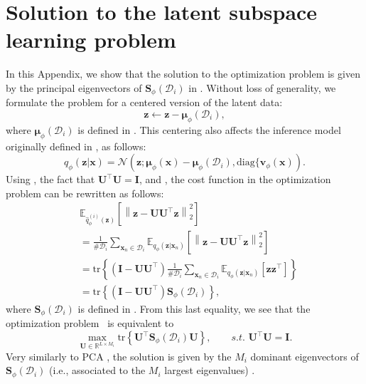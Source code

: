 \documentclass[review]{elsarticle}
\newcommand{\diag}{\text{diag}}
\newcommand{\tr}{\text{tr}}
\begin{document}
\appendix
\section{Solution to the latent subspace learning problem}
\label{app:PCA}

In this Appendix, we show that the solution to the optimization problem  is given by the principal eigenvectors of $\mathbf{S}_\phi(\mathcal{D}_i)$ in . Without loss of generality, we formulate the problem for a centered version of the latent data:
\begin{equation}
    \mathbf{z} \leftarrow \mathbf{z} - \boldsymbol{\mu}_\phi(\mathcal{D}_i),
\end{equation}
where $\boldsymbol{\mu}_\phi(\mathcal{D}_i)$ is defined in . This centering also affects the inference model originally defined in , as follows:
\begin{equation}
    q_\phi(\mathbf{z} | \mathbf{x}) = \mathcal{N}\left(\mathbf{z}; \boldsymbol{\mu}_{\phi}(\mathbf{x}) - \boldsymbol{\mu}_\phi(\mathcal{D}_i), \diag\{\mathbf{v}_{\phi}(\mathbf{x}) \right).
    \label{inf_model_center}
\end{equation}
Using , the fact that $\mathbf{U}^\top \mathbf{U} = \mathbf{I}$, and , the cost function in the optimization problem  can be rewritten as follows:
\begin{align}
    & \mathbb{E}_{\hat{q}_\phi^{(i)}(\mathbf{z})} \left[ \left\lVert \mathbf{z} - \mathbf{U} \mathbf{U}^\top \mathbf{z} \right\rVert_2^2 \right] \nonumber \\
    & = \frac{1}{\# \mathcal{D}_i} \sum_{\mathbf{x}_n \in \mathcal{D}_i} \mathbb{E}_{q_\phi(\mathbf{z} | \mathbf{x}_n)}\left[ \left\lVert \mathbf{z} - \mathbf{U} \mathbf{U}^\top \mathbf{z} \right\rVert_2^2 \right] \nonumber \\
    & = \tr\left\{ (\mathbf{I} - \mathbf{U} \mathbf{U}^\top) \frac{1}{\# \mathcal{D}_i} \sum_{\mathbf{x}_n \in \mathcal{D}_i} \mathbb{E}_{q_\phi(\mathbf{z} | \mathbf{x}_n)}[ \mathbf{z} \mathbf{z}^\top] \right\} \nonumber \\
    & = \tr\left\{ (\mathbf{I} - \mathbf{U} \mathbf{U}^\top) \mathbf{S}_\phi(\mathcal{D}_i) \right\},
\end{align}
where $\mathbf{S}_\phi(\mathcal{D}_i)$ is defined in . From this last equality, we see that the optimization problem~ is equivalent to
\begin{equation}
    \max_{\mathbf{U} \in \mathbb{R}^{L \times M_i}} \tr\left\{ \mathbf{U}^\top \mathbf{S}_\phi(\mathcal{D}_i) \mathbf{U} \right\}, \qquad s.t.\,\, \mathbf{U}^\top \mathbf{U} = \mathbf{I}.
\end{equation}
Very similarly to PCA \citep{pearson1901liii}, the solution is given by the $M_i$ dominant eigenvectors of $\mathbf{S}_\phi(\mathcal{D}_i)$ (i.e., associated to the $M_i$ largest eigenvalues) \citep[Section 12.1]{Bishop06}.
\end{document}

